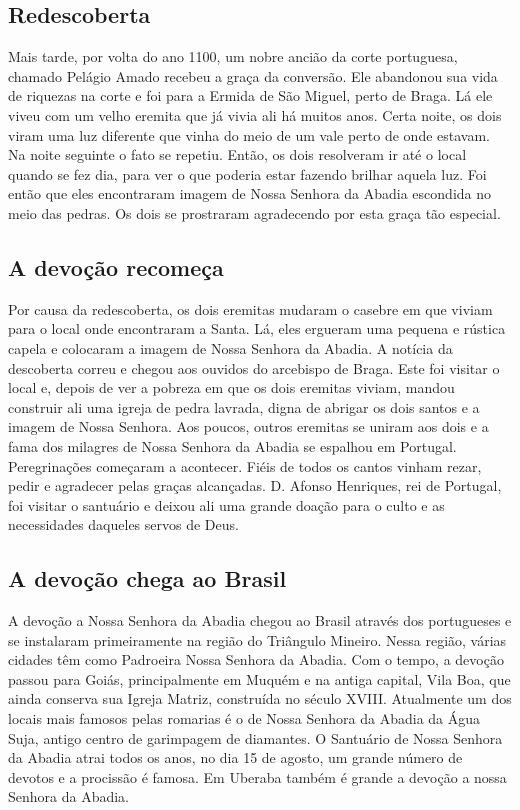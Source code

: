 \documentclass[a4paper,14pt]{extarticle} \usepackage[utf8]{inputenc}
\begin{document}
\subsection{Redescoberta}

Mais tarde, por volta do ano 1100, um nobre ancião da corte portuguesa, chamado Pelágio Amado recebeu a graça da conversão. Ele abandonou sua vida de riquezas na corte e foi para a Ermida de São Miguel, perto de Braga. Lá ele viveu com um velho eremita que já vivia ali há muitos anos. Certa noite, os dois viram uma luz diferente que vinha do meio de um vale perto de onde estavam. Na noite seguinte o fato se repetiu. Então, os dois resolveram ir até o local quando se fez dia, para ver o que poderia estar fazendo brilhar aquela luz. Foi então que  eles encontraram imagem de Nossa Senhora da Abadia escondida no meio das pedras. Os dois se prostraram agradecendo por esta graça tão especial.

\subsection{A devoção recomeça}

Por causa da redescoberta, os dois eremitas mudaram o casebre em que viviam para o local onde encontraram a Santa. Lá, eles ergueram uma pequena e rústica capela e colocaram a imagem de Nossa Senhora da Abadia. A notícia da descoberta correu e chegou aos ouvidos do arcebispo de Braga. Este foi visitar o local e, depois de ver a pobreza em que os dois eremitas viviam, mandou construir ali uma igreja de pedra lavrada, digna de abrigar os dois santos e a imagem de Nossa Senhora. Aos poucos, outros eremitas se uniram aos dois e a fama dos milagres de Nossa Senhora da Abadia se espalhou em Portugal. Peregrinações começaram a acontecer. Fiéis de todos os cantos vinham rezar, pedir e agradecer pelas graças alcançadas. D. Afonso Henriques, rei de Portugal, foi visitar o santuário e deixou ali uma grande doação para o culto e as necessidades daqueles servos de Deus.

\subsection{A devoção chega ao Brasil}

A devoção a Nossa Senhora da Abadia chegou ao Brasil através dos portugueses e se instalaram primeiramente na região do Triângulo Mineiro. Nessa região, várias cidades têm como Padroeira Nossa Senhora da Abadia. Com o tempo, a devoção passou para Goiás, principalmente em Muquém e na antiga capital, Vila Boa, que ainda conserva sua Igreja Matriz, construída no século XVIII. Atualmente um dos locais mais famosos pelas romarias é o de Nossa Senhora da Abadia da Água Suja, antigo centro de garimpagem de diamantes. O Santuário de Nossa Senhora da Abadia atrai todos os anos, no dia 15 de agosto, um grande número de devotos e a procissão é famosa. Em Uberaba também é grande a devoção a nossa Senhora da Abadia.
\end{document}
